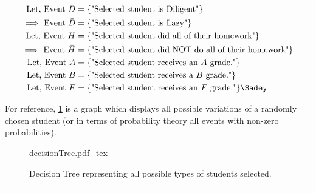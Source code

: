 \begin{align}
	\text{Let, Event } D &= \set{\text{"Selected student is Diligent"}} \nonumber\\
	\text{$\implies$ Event } \bar{D} &= \set{\text{"Selected student is Lazy"}} \nonumber\\
	\text{Let, Event } H &= \set{\text{"Selected student did all of their homework"}} \nonumber\\
	\text{$\implies$ Event } \bar{H} &= \set{\text{"Selected student did NOT do all of their homework"}} \nonumber\\
	\text{Let, Event } A &= \set{\text{"Selected student receives an $A$ grade."}} \nonumber\\
	\text{Let, Event } B &= \set{\text{"Selected student receives a $B$ grade."}} \nonumber\\
		\text{Let, Event } F &= \set{\text{"Selected student receives an $F$ grade."}} \nonumber \Sadey
\end{align}

For reference, \cref{fig:decisionTree} is a graph which displays all possible variations of a randomly chosen student (or in terms of probability theory all events with non-zero probabilities).

\begin{figure}[H]
	\centering
	\begin{adjustbox}{max width=\textwidth}
		{decisionTree.pdf_tex}
	\end{adjustbox}
	\caption{Decision Tree representing all possible types of students selected.}
	\label{fig:decisionTree}
\end{figure}
\noindent\rule{\textwidth}{1pt}

